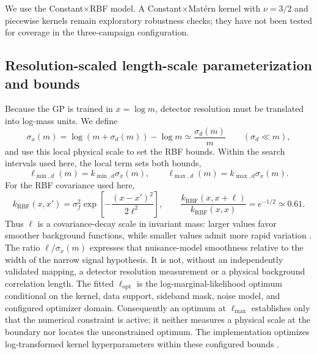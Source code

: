 We use the Constant$\times$RBF model. A Constant$\times$Mat\'ern kernel with
$\nu=3/2$ and piecewise kernels remain exploratory robustness checks; they have not
been tested for coverage in the three-campaign configuration.

\subsection{Resolution-scaled length-scale parameterization and bounds}
\label{sec:length-scale}

Because the GP is trained in $x=\log m$, detector resolution must be translated into
log-mass units. We define
\begin{equation}
\sigma_x(m) = \log\!\left(m+\sigma_d(m)\right) - \log m
\simeq \frac{\sigma_d(m)}{m}
\qquad (\sigma_d \ll m),
\end{equation}
and use this local physical scale to set the RBF bounds. Within the search intervals used here, the local term sets both bounds,
\begin{equation}
\ell_{\min,d}(m) = k_{\min,d}\sigma_x(m),
\qquad
\ell_{\max,d}(m) = k_{\max,d}\sigma_x(m).
\label{eq:dataset-lengthscale-bounds}
\end{equation}
For the RBF covariance used here,
\begin{equation}
k_{\mathrm{RBF}}(x,x') =
\sigma_f^2\exp\!\left[-\frac{(x-x')^2}{2\ell^2}\right],
\qquad
\frac{k_{\mathrm{RBF}}(x,x+\ell)}{k_{\mathrm{RBF}}(x,x)}
=e^{-1/2}\simeq0.61 .
\label{eq:rbf-lengthscale-interpretation}
\end{equation}
Thus $\ell$ is a covariance-decay scale in invariant mass: larger values
favor smoother background functions, while smaller values admit more rapid
variation \cite{RasmussenWilliams2006,FrateGP2017}. The ratio
$\ell/\sigma_x(m)$ expresses that nuisance-model smoothness relative to the width of
the narrow signal hypothesis. It is not, without an independently validated mapping,
a detector resolution measurement or a physical background correlation length.
The fitted $\ell_{\mathrm{opt}}$ is the log-marginal-likelihood optimum conditional
on the kernel, data support, sideband mask, noise model, and configured optimizer
domain. Consequently an optimum at $\ell_{\max}$ establishes only that the numerical
constraint is active; it neither measures a physical scale at the boundary nor
locates the unconstrained optimum. The implementation optimizes log-transformed
kernel hyperparameters within these configured bounds
\cite{ScikitLearnGPRDocs16}.

